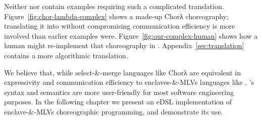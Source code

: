 Neither \cite{chor-lambda} nor \cite{chor-lambda-2} contain examples requiring such a complicated translation.
Figure~\ref{fig:chor-lambda-complex} shows a made-up Chorλ choreography;
translating it into \HLSCentral without compromising communication efficiency is more involved than earlier examples were.
Figure~\ref{fig:our-complex-human} shows how a human might re-implement that choreography in \HLSCentral.
Appendix~\ref{sec:translation} contains a more algorithmic translation.

We believe that, while select-\&-merge languages like Chorλ are equivalent
in expressivity and communication efficiency to enclaves-\&-MLVs languages like \HLSCentral,
\HLSCentral's syntax and semantics are more user-friendly for most software engineering purposes.
In the following chapter we present an eDSL implementation of enclave-\&-MLVs choreographic programming,
and demonstrate its use.

